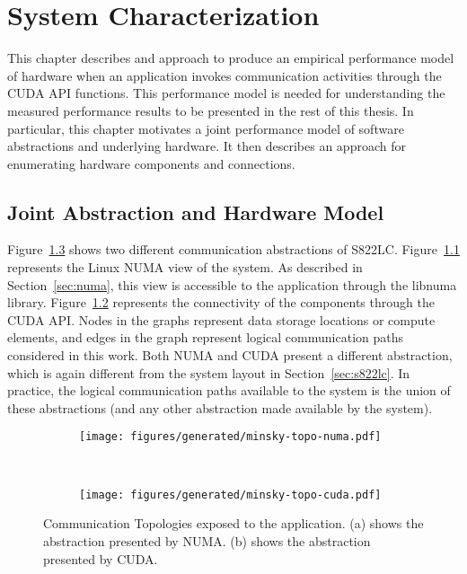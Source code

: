 \chapter{System Characterization}
\label{ch:sys-char}

This chapter describes and approach to produce an empirical performance model of hardware when an application invokes communication activities through the CUDA API functions.
This performance model is needed for understanding the measured performance results to be presented in the rest of this thesis.
In particular, this chapter motivates a joint performance model of software abstractions and underlying hardware.
It then describes an approach for enumerating hardware components and connections.

\section{Joint Abstraction and Hardware Model}
\label{sec:abstraction-hardware}

Figure~\ref{fig:minsky-abstraction} shows two different communication abstractions of S822LC.
Figure~\ref{fig:minsky-topo-numa} represents the Linux NUMA view of the system.
As described in Section~\ref{sec:numa}, this view is accessible to the application through the libnuma library.
Figure~\ref{fig:minsky-topo-cuda} represents the connectivity of the components through the CUDA API.
Nodes in the graphs represent data storage locations or compute elements, and edges in the graph represent logical communication paths considered in this work.
Both NUMA and CUDA present a different abstraction, which is again different from the system layout in Section~\ref{sec:s822lc}.
In practice, the logical communication paths available to the system is the union of these abstractions (and any other abstraction made available by the system).

\begin{figure}[ht]
    \centering
    \begin{subfigure}[b]{0.45\textwidth}
        \texttt{[image: figures/generated/minsky-topo-numa.pdf]}
        \caption{}
        \label{fig:minsky-topo-numa}
    \end{subfigure}
    ~
    \begin{subfigure}[b]{0.45\textwidth}
        \texttt{[image: figures/generated/minsky-topo-cuda.pdf]}
        \caption{}
        \label{fig:minsky-topo-cuda}
    \end{subfigure}
    \caption[Communication Topologies Exposed to Application]{
        Communication Topologies exposed to the application.
        (a) shows the abstraction presented by NUMA.
        (b) shows the abstraction presented by CUDA.
    }
    \label{fig:minsky-abstraction}
\end{figure}

